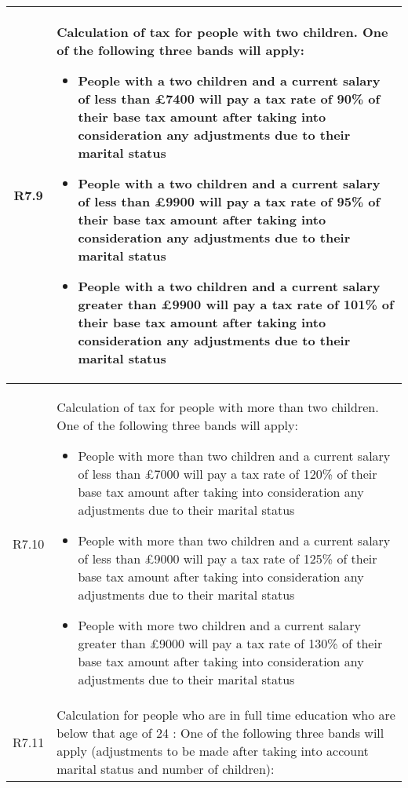 \begin{table}[H]
\small
\centering
\begin{tabularx}{\textwidth}{| c | X |}
	\hline %
	R7.9 & Calculation of tax for people with two children. One of the following three bands will apply:
	\begin{itemize}[itemsep=\tableitemsep, leftmargin=\tableleftsep]
		\item People with a two children and a current salary of less than £7400 will pay a tax rate of 90\% of their base tax amount after taking into consideration any adjustments due to their marital status
		\item People with a two children and a current salary of less than £9900 will pay a tax rate of 95\% of their base tax amount after taking into consideration any adjustments due to their marital status
		\item People with a two children and a current salary greater than £9900 will pay a tax rate of 101\% of their base tax amount after taking into consideration any adjustments due to their marital status
	\end{itemize}
	\\
	\hline %
	R7.10 & Calculation of tax for people with more than two children. One of the following three bands will apply:
	\begin{itemize}[itemsep=\tableitemsep, leftmargin=\tableleftsep]
		\item People with more than two children and a current salary of less than £7000 will pay a tax rate of 120\% of their base tax amount after taking into consideration any adjustments due to their marital status
		\item People with more than two children and a current salary of less than £9000 will pay a tax rate of 125\% of their base tax amount after taking into consideration any adjustments due to their marital status
		\item People with more two children and a current salary greater than £9000 will pay a tax rate of 130\% of their base tax amount after taking into consideration any adjustments due to their marital status
	\end{itemize}
	\\
	\hline %
	R7.11 & Calculation for people who are in full time education who are below that age of 24 : One of the following three bands will apply (adjustments to be made after taking into account marital status and number of children):

\end{tabularx}
\end{table}
